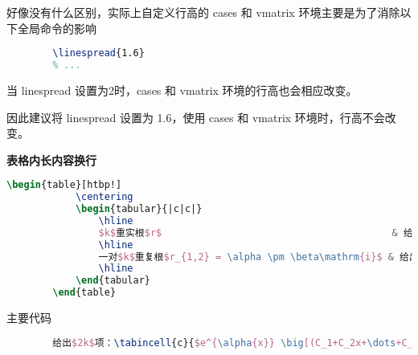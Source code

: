 \documentclass[12pt, a4paper, oneside, UTF8]{ctexbook}
\begin{document}
    好像没有什么区别，实际上自定义行高的 cases 和 vmatrix 环境主要是为了消除以下全局命令的影响
    \begin{lstlisting}[language=TeX]
        % package.tex
        \linespread{1.6}
        % ...
    \end{lstlisting}

    当 linespread 设置为2时，cases 和 vmatrix 环境的行高也会相应改变。

    因此建议将 linespread 设置为 1.6，使用 cases 和 vmatrix 环境时，行高不会改变。


    \textbf{表格内长内容换行}

    \begin{lstlisting}[language=TeX]
        \begin{table}[htbp!]
            \centering
            \begin{tabular}{|c|c|}
                \hline
                $k$重实根$r$                                        & 给出$k$项：$e^{rx}(C_1+C_2x+\dots+C_kx^{k-1})$                                         \\
                \hline
                一对$k$重复根$r_{1,2} = \alpha \pm \beta\mathrm{i}$ & 给出$2k$项：\tabincell{c}{$e^{\alpha{x}} \big[(C_1+C_2x+\dots+C_kx^{k-1})\cos\beta{x}$ \\ $+ (D_1+D_2x+\dots+D_kx^{k-1})\sin\beta{x} \big]$} \\
                \hline
            \end{tabular}
        \end{table}
    \end{lstlisting}

    主要代码

    \begin{lstlisting}[language=TeX]
        % ...
        给出$2k$项：\tabincell{c}{$e^{\alpha{x}} \big[(C_1+C_2x+\dots+C_kx^{k-1})\cos\beta{x}$ \\ $ + (D_1+D_2x+\dots+D_kx^{k-1})\sin\beta{x} \big]$}
    \end{lstlisting}
\end{document}
